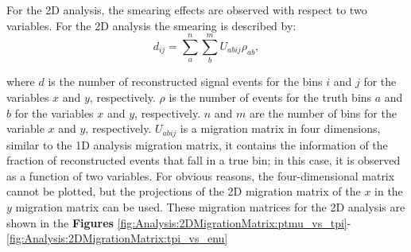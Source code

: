 For the 2D analysis, the smearing effects are observed with respect to two variables. For the 2D analysis the smearing is described by:
\begin{equation}
    d_{ij}=\sum^{n}_{a}\sum^{m}_{b}U_{abij}\rho_{ab},
    \label{eq:Analysis:unfolding:SmearingEq2D}
\end{equation}

where $d$ is the number of reconstructed signal events for the bins $i$ and $j$ for the variables $x$ and $y$, respectively. $\rho$ is the number of events for the truth bins $a$ and $b$ for the variables $x$ and $y$, respectively. $n$ and $m$ are the number of bins for the variable $x$ and $y$, respectively. $U_{abij}$ is a migration matrix in four dimensions, similar to the 1D analysis migration matrix, it contains the information of the fraction of reconstructed events that fall in a true bin; in this case, it is observed as a function of two variables. For obvious reasons, the four-dimensional matrix cannot be plotted, but the projections of the 2D migration matrix of the $x$ in the $y$ migration matrix can be used. These migration matrices for the 2D analysis are shown in the \textbf{Figures} \ref{fig:Analysis:2DMigrationMatrix:ptmu_vs_tpi}-\ref{fig:Analysis:2DMigrationMatrix:tpi_vs_enu}

